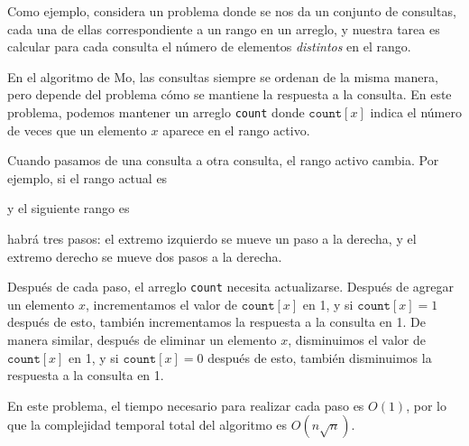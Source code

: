 Como ejemplo, considera un problema
donde se nos da un conjunto de consultas,
cada una de ellas correspondiente a un rango en un arreglo,
y nuestra tarea es calcular para cada consulta
el número de elementos \emph{distintos} en el rango.

En el algoritmo de Mo, las consultas siempre se ordenan
de la misma manera, pero depende del problema
cómo se mantiene la respuesta a la consulta.
En este problema, podemos mantener un arreglo
\texttt{count} donde $\texttt{count}[x]$
indica el número de veces que un elemento $x$
aparece en el rango activo.

Cuando pasamos de una consulta a otra consulta,
el rango activo cambia.
Por ejemplo, si el rango actual es
\begin{center}
\end{center}
y el siguiente rango es
\begin{center}
\end{center}
habrá tres pasos:
el extremo izquierdo se mueve un paso a la derecha,
y el extremo derecho se mueve dos pasos a la derecha.

Después de cada paso, el arreglo \texttt{count}
necesita actualizarse.
Después de agregar un elemento $x$,
incrementamos el valor de
$\texttt{count}[x]$ en 1,
y si $\texttt{count}[x]=1$ después de esto,
también incrementamos la respuesta a la consulta en 1.
De manera similar, después de eliminar un elemento $x$,
disminuimos el valor de
$\texttt{count}[x]$ en 1,
y si $\texttt{count}[x]=0$ después de esto,
también disminuimos la respuesta a la consulta en 1.

En este problema, el tiempo necesario para realizar
cada paso es $O(1)$, por lo que la complejidad temporal total
del algoritmo es $O(n \sqrt n)$.
